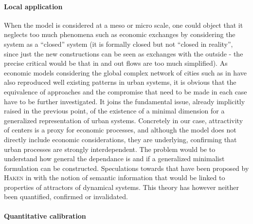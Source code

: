 \documentclass[a4paper,twocolumn,twoside,10pt]{article}
\newcommand{\noun}[1]{\textsc{#1}}
\begin{document}
\bigskip{}



\paragraph{Local application}

When the model is considered at a meso or micro scale, one could object
that it neglects too much phenomena such as economic exchanges by
considering the system as a ``closed'' system (it is formally closed
but not ``closed in reality'', since just the new constructions
can be seen as exchanges with the outside - the precise critical would
be that in and out flows are too much simplified). As economic models
considering the global complex network of cities such as in \cite{andersson2003urban}
have also reproduced well existing patterns in urban systems, it is
obvious that the equivalence of approaches and the compromise that
need to be made in each case have to be further investigated. It joins
the fundamental issue, already implicitly raised in the previous
point, of the existence of a minimal dimension for a generalized representation
of urban systems. Concretely in our case, attractivity of centers
is a proxy for economic processes, and although the model does not
directly include economic considerations, they are underlying, confirming
that urban processes are strongly interdependent. The problem would
be to understand how general the dependance is and if a generalized
minimalist formulation can be constructed. Speculations towards that
have been proposed by \noun{Haken} in \cite{haken2003face} with the
notion of semantic information that would be linked to properties
of attractors of dynamical systems. This theory has however neither
been quantified, confirmed or invalidated.

\bigskip{}



\paragraph{Quantitative calibration}
\end{document}
